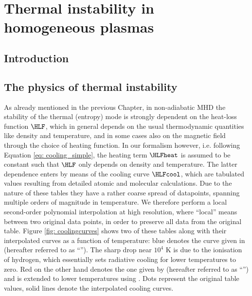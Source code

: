 \chapter{Thermal instability in homogeneous plasmas} \label{ch: thermal instability}

\graphicspath{{03-thermal_instability/figures/}}


\section{Introduction}

\section{The physics of thermal instability}
As already mentioned in the previous Chapter, in non-adiabatic MHD the stability of the thermal (entropy) mode is strongly dependent on the heat-loss function $\HLF$, which in general depends on the usual thermodynamic quantities like density and temperature, and in some cases also on the magnetic field through the choice of heating function. In our formalism however, i.e. following Equation \eqref{eq: cooling_simple}, the heating term $\HLFheat$ is assumed to be constant such that $\HLF$ only depends on density and temperature. The latter dependence enters by means of the cooling curve $\HLFcool$, which are tabulated values resulting from detailed atomic and molecular calculations. Due to the nature of these tables they have a rather coarse spread of datapoints, spanning multiple orders of magnitude in temperature. We therefore perform a local second-order polynomial interpolation at high resolution, where ``local'' means between two original data points, in order to preserve all data from the original table.
Figure \ref{fig: coolingcurves} shows two of these tables along with their interpolated curves as a function of temperature: blue denotes the curve given in \citet{colgan2008} (hereafter referred to as ``\jccorona''). The sharp drop near $10^4$ K is due to the ionisation of hydrogen, which essentially sets radiative cooling for lower temperatures to zero. Red on the other hand denotes the one given by \citet{schure2009} (hereafter referred to as ``\spexdm'') and is extended to lower temperatures using \citet{dalgarno1972}. Dots represent the original table values, solid lines denote the interpolated cooling curves.

